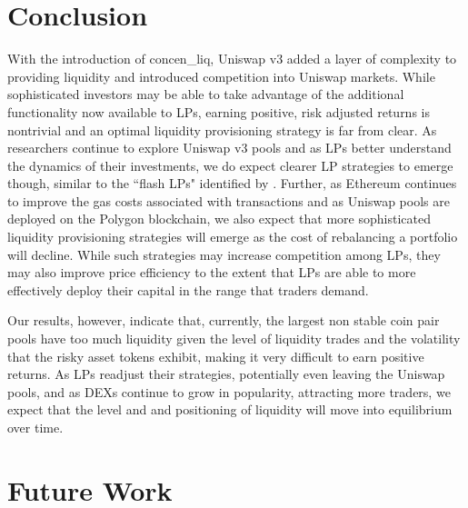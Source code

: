\documentclass[11pt]{article}
\begin{document}
\section{Conclusion}\label{sec:6}

With the introduction of  \gls{concen_liq}, Uniswap v3 added a layer of complexity to providing liquidity and introduced competition into Uniswap markets. While sophisticated investors may be able to take advantage of the additional functionality now available to LPs, earning positive, risk adjusted returns is nontrivial and an optimal liquidity provisioning strategy is far from clear. As researchers continue to explore Uniswap v3 pools and as LPs better understand the dynamics of their investments, we do expect clearer LP strategies to emerge though, similar to the ``flash LPs" identified by \citet{loesch2021impermanent}. Further, as Ethereum continues to improve the gas costs associated with transactions and as Uniswap pools are deployed on the Polygon blockchain, we also expect that more sophisticated liquidity provisioning strategies will emerge as the cost of rebalancing a portfolio will decline. While such strategies may increase competition among LPs, they may also improve price efficiency to the extent that LPs are able to more effectively deploy their capital in the range that traders demand.

Our results, however, indicate that, currently, the largest non stable coin pair pools have too much liquidity given the level of liquidity trades and the volatility that the risky asset tokens exhibit, making it very difficult to earn positive returns. As LPs readjust their strategies, potentially even leaving the Uniswap pools, and as DEXs continue to grow in popularity, attracting more traders, we expect that the level and and positioning of liquidity will move into equilibrium over time.

\section{Future Work}\label{}

\newpage

\end{document}
